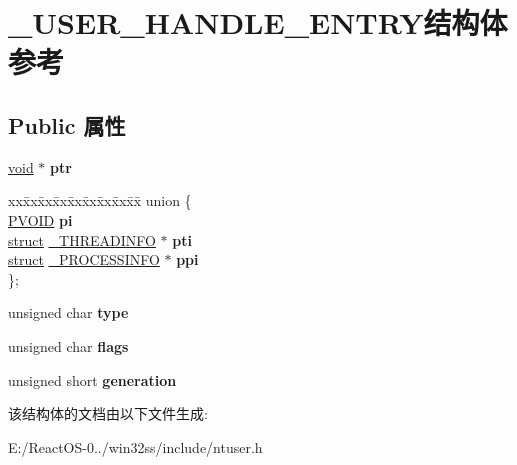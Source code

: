 \hypertarget{struct___u_s_e_r___h_a_n_d_l_e___e_n_t_r_y}{}\section{\+\_\+\+U\+S\+E\+R\+\_\+\+H\+A\+N\+D\+L\+E\+\_\+\+E\+N\+T\+R\+Y结构体 参考}
\label{struct___u_s_e_r___h_a_n_d_l_e___e_n_t_r_y}
\subsection*{Public 属性}
\begin{DoxyCompactItemize}
\item 
\mbox{\label{struct___u_s_e_r___h_a_n_d_l_e___e_n_t_r_y_a8c9792274aa7d17c55efa7345c6ec196}} 
\hyperlink{interfacevoid}{void} $\ast$ {\bfseries ptr}
\item 
\mbox{\label{struct___u_s_e_r___h_a_n_d_l_e___e_n_t_r_y_ab47971e906f7c798f41183b0521315af}} 
\begin{tabbing}
xx\=xx\=xx\=xx\=xx\=xx\=xx\=xx\=xx\=\kill
union \{\\
\>\hyperlink{interfacevoid}{PVOID} {\bfseries pi}\\
\>\hyperlink{interfacestruct}{struct} \hyperlink{struct___t_h_r_e_a_d_i_n_f_o}{\_THREADINFO} $\ast$ {\bfseries pti}\\
\>\hyperlink{interfacestruct}{struct} \hyperlink{struct___p_r_o_c_e_s_s_i_n_f_o}{\_PROCESSINFO} $\ast$ {\bfseries ppi}\\
\}; \\

\end{tabbing}\item 
\mbox{\label{struct___u_s_e_r___h_a_n_d_l_e___e_n_t_r_y_ae105c5a6be88e74a99e57a10f486920b}} 
unsigned char {\bfseries type}
\item 
\mbox{\label{struct___u_s_e_r___h_a_n_d_l_e___e_n_t_r_y_a9b1e8ddef5df7da4d090082a4f189ce6}} 
unsigned char {\bfseries flags}
\item 
\mbox{\label{struct___u_s_e_r___h_a_n_d_l_e___e_n_t_r_y_a74b0811b80fcc9ddeef572f703ab2284}} 
unsigned short {\bfseries generation}
\end{DoxyCompactItemize}


该结构体的文档由以下文件生成\+:\begin{DoxyCompactItemize}
\item 
E\+:/\+React\+O\+S-\/0../win32ss/include/ntuser.\+h\end{DoxyCompactItemize}
